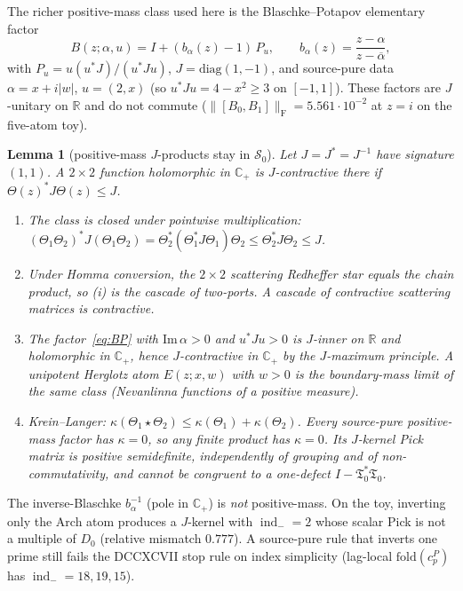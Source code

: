 \documentclass[11pt]{article}
\newtheorem{lemma}{Lemma}
\theoremstyle{remark}
\newcommand{\Tfrak}{\mathfrak{T}}
\newcommand{\indm}{\operatorname{ind}_{-}}
\newcommand{\redh}{\mathbin{\star}}
\newcommand{\Sk}{\mathcal{S}}
\begin{document}
The richer positive-mass class used here is the
Blaschke--Potapov elementary factor
\begin{equation}\label{eq:BP}
B(z;\alpha,u)
=I+(b_\alpha(z)-1)\,P_u,
\qquad
b_\alpha(z)=\frac{z-\alpha}{z-\overline{\alpha}},
\end{equation}
with $P_u=u(u^*J)/ (u^*Ju)$, $J=\mathrm{diag}(1,-1)$,
and source-pure data $\alpha=x+i\lvert w\rvert$,
$u=(2,x)$ (so $u^*Ju=4-x^2\ge 3$ on $[-1,1]$).
These factors are $J$-unitary on $\mathbb{R}$ and do not
commute ($\lVert[B_0,B_1]\rVert_{\mathrm{F}}=5.561\cdot 10^{-2}$
at $z=i$ on the five-atom toy).

\begin{lemma}[positive-mass $J$-products stay in $\Sk_0$]
\label{lem:s0}
Let $J=J^*=J^{-1}$ have signature $(1,1)$.
A $2\times 2$ function holomorphic in $\mathbb{C}_+$ is
$J$-contractive there if $\Theta(z)^*J\Theta(z)\le J$.
\begin{enumerate}
\item[(i)]
The class is closed under pointwise multiplication:
$(\Theta_1\Theta_2)^*J(\Theta_1\Theta_2)
=\Theta_2^*(\Theta_1^*J\Theta_1)\Theta_2
\le\Theta_2^*J\Theta_2\le J$.
\item[(ii)]
Under Homma conversion, the $2\times 2$ scattering
Redheffer star equals the chain product, so (i) is the
cascade of two-ports.  A cascade of contractive scattering
matrices is contractive.
\item[(iii)]
The factor~\eqref{eq:BP} with $\mathrm{Im}\,\alpha>0$ and
$u^*Ju>0$ is $J$-inner on $\mathbb{R}$ and holomorphic in
$\mathbb{C}_+$, hence $J$-contractive in $\mathbb{C}_+$ by
the $J$-maximum principle.
A unipotent Herglotz atom $E(z;x,w)$ with $w>0$ is the
boundary-mass limit of the same class (Nevanlinna functions
of a positive measure).
\item[(iv)]
Krein--Langer: $\kappa(\Theta_1\redh\Theta_2)
\le\kappa(\Theta_1)+\kappa(\Theta_2)$.
Every source-pure positive-mass factor has $\kappa=0$, so
any finite product has $\kappa=0$.
Its $J$-kernel Pick matrix is positive semidefinite,
independently of grouping and of non-commutativity, and
cannot be congruent to a one-defect $I-\Tfrak_0^*\Tfrak_0$.
\end{enumerate}
\end{lemma}

\noindent
The inverse-Blaschke $b_\alpha^{-1}$ (pole in $\mathbb{C}_+$)
is \emph{not} positive-mass.
On the toy, inverting only the Arch atom produces a
$J$-kernel with $\indm=2$ whose scalar Pick is not a
multiple of $D_0$ (relative mismatch $0.777$).
A source-pure rule that inverts one prime still fails the
DCCXCVII stop rule on index simplicity (lag-local
$\mathrm{fold}(c^P_p)$ has $\indm=18,19,15$).
\end{document}
